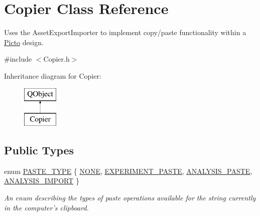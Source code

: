 \hypertarget{class_copier}{\section{Copier Class Reference}
\label{class_copier}
}


Uses the Asset\-Export\-Importer to implement copy/paste functionality within a \hyperlink{namespace_picto}{Picto} design.  




{\ttfamily \#include $<$Copier.\-h$>$}

Inheritance diagram for Copier\-:\begin{figure}[H]
\begin{center}
\leavevmode
\includegraphics[height=2.000000cm]{class_copier}
\end{center}
\end{figure}
\subsection*{Public Types}
\begin{DoxyCompactItemize}
\item 
enum \hyperlink{class_copier_a6bbbcb9f46198d2d909e72251dbc7fd0}{P\-A\-S\-T\-E\-\_\-\-T\-Y\-P\-E} \{ \hyperlink{class_copier_a6bbbcb9f46198d2d909e72251dbc7fd0abd620bc471b141055f34b5aedd966885}{N\-O\-N\-E}, 
\hyperlink{class_copier_a6bbbcb9f46198d2d909e72251dbc7fd0a2f196ec5d25c7b273fd9e024b091f869}{E\-X\-P\-E\-R\-I\-M\-E\-N\-T\-\_\-\-P\-A\-S\-T\-E}, 
\hyperlink{class_copier_a6bbbcb9f46198d2d909e72251dbc7fd0a09f4fba45a06a62a6f37a3c937109c7d}{A\-N\-A\-L\-Y\-S\-I\-S\-\_\-\-P\-A\-S\-T\-E}, 
\hyperlink{class_copier_a6bbbcb9f46198d2d909e72251dbc7fd0add4709cbab9f7354c74f253f8e917d7c}{A\-N\-A\-L\-Y\-S\-I\-S\-\_\-\-I\-M\-P\-O\-R\-T}
 \}
\begin{DoxyCompactList}\small\item\em An enum describing the types of paste operations available for the string currently in the computer's clipboard. \end{DoxyCompactList}\end{DoxyCompactItemize}
